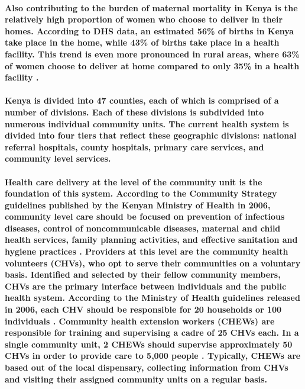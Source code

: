 \paragraph{Also contributing to the burden of maternal mortality in Kenya is the relatively high proportion of women who choose to deliver in their homes. According to DHS data, an estimated 56\% of births in Kenya take place in the home, while 43\% of births take place in a health facility. This trend is even more pronounced in rural areas, where 63\% of women choose to deliver at home compared to only 35\% in a health facility \citep{DHS2010}.}



\paragraph{Kenya is divided into 47 counties, each of which is comprised of a number of divisions. Each of these divisions is subdivided into numerous individual community units. The current health system is divided into four tiers that reflect these geographic divisions: national referral hospitals, county hospitals, primary care services, and community level services. \citep{SPA2010}}

\paragraph{Health care delivery at the level of the community unit is the foundation of this system. According to the Community Strategy guidelines published by the Kenyan Ministry of Health in 2006, community level care should be focused on prevention of infectious diseases, control of noncommunicable diseases, maternal and child health services, family planning activities, and effective sanitation and hygiene practices \citep{CommunityStrategy2006}. Providers at this level are the community  health volunteers (CHVs), who opt to serve their communities on a voluntary basis. Identified and selected by their fellow community members, CHVs are the primary interface between individuals and the public health system. According to the Ministry of Health guidelines released in 2006, each CHV should be responsible for 20 households or 100 individuals \citep{CommunityStrategy2006}. Community health extension workers (CHEWs) are responsible for training and supervising a cadre of 25 CHVs each. In a single community unit, 2 CHEWs should supervise approximately 50 CHVs in order to provide care to 5,000 people \citep{CommunityStrategy2006}. Typically, CHEWs are based out of the local dispensary, collecting information from CHVs and visiting their assigned community units on a regular basis.}


